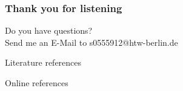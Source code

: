 \begin{frame}
    \frametitle{Thank you for listening}

    \begin{center}
        Do you have questions? \\
        Send me an E-Mail to s0555912@htw-berlin.de
    \end{center}
\end{frame}

\begin{frame}[allowframebreaks]{Literature references}
    \printbibliography[
        notkeyword={online},
        heading=none
    ]
\end{frame}

\begin{frame}[allowframebreaks]{Online references}
    \printbibliography[
        keyword={online},
        heading=none
    ]
\end{frame}